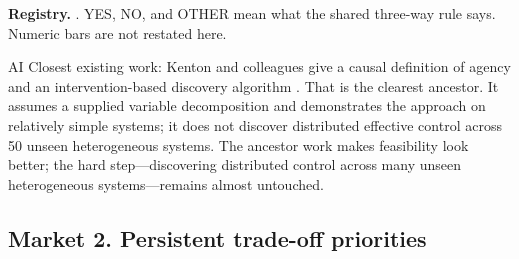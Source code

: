 \begin{predictionresolution}
\textbf{Registry.} . YES, NO, and OTHER mean what the shared three-way rule says. Numeric bars are not restated here.
\end{predictionresolution}
\begin{authbar}{AI}
Closest existing work: Kenton and colleagues give a causal definition of agency and an intervention-based discovery algorithm \autocite{kenton2022discovering}.
That is the clearest ancestor.
It assumes a supplied variable decomposition and demonstrates the approach on relatively simple systems; it does not discover distributed effective control across 50 unseen heterogeneous systems.
The ancestor work makes feasibility look better; the hard step---discovering distributed control across many unseen heterogeneous systems---remains almost untouched.
\end{authbar}
\authbarneedspace

\subsection{Market 2. Persistent trade-off priorities}
\label{sec:appp-m2}

